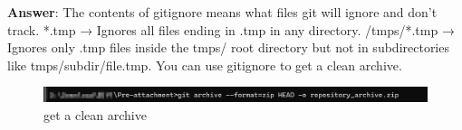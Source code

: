 \documentclass{article}
\begin{document}
\textbf{Answer}: The contents of gitignore means what files git will ignore and don't track. *.tmp → Ignores all files ending in .tmp in any directory. /tmps/*.tmp → Ignores only .tmp files inside the tmps/ root directory but not in subdirectories like tmps/subdir/file.tmp.
You can use gitignore to get a clean archive.

\begin{figure}[H]
\centering
\includegraphics[width = \textwidth]{../figures/archive.png}
\caption{get a clean archive}
\end{figure}
\end{document}
